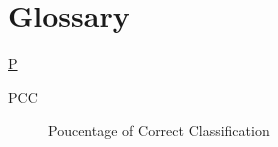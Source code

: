 \chapter*{Glossary}

{\underline{P}}
\begin{description}
\item [PCC] Poucentage of Correct Classification 
\end{description}





 



